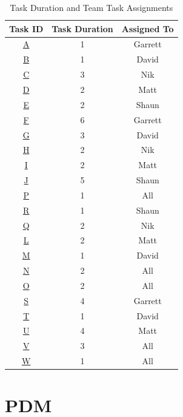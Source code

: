 \begin{table}[H]
\centering
\begin{tabular}{c | c | c}
Task ID & Task Duration & Assigned To \\
\hline
\hyperref[task:A]{A} & 1 & Garrett \\
\hyperref[task:B]{B} & 1 & David \\
\hyperref[task:C]{C} & 3 & Nik \\
\hyperref[task:D]{D} & 2 & Matt \\
\hyperref[task:E]{E} & 2 & Shaun \\
\hyperref[task:F]{F} & 6 & Garrett \\
\hyperref[task:G]{G} & 3 & David \\
\hyperref[task:H]{H} & 2 & Nik \\
\hyperref[task:I]{I} & 2 & Matt \\
\hyperref[task:J]{J} & 5 & Shaun \\
\hyperref[task:P]{P} & 1 & All \\
\hyperref[task:R]{R} & 1 & Shaun \\
\hyperref[task:Q]{Q} & 2 & Nik \\
\hyperref[task:L]{L} & 2 & Matt \\
\hyperref[task:M]{M} & 1 & David \\
\hyperref[task:N]{N} & 2 & All \\
\hyperref[task:O]{O} & 2 & All \\
\hyperref[task:S]{S} & 4 & Garrett \\
\hyperref[task:T]{T} & 1 & David \\
\hyperref[task:U]{U} & 4 & Matt \\
\hyperref[task:V]{V} & 3 & All \\
\hyperref[task:W]{W} & 1 & All \\
\end{tabular}
\caption{Task Duration and Team Task Assignments}
\label{table:tasks}
\end{table}

\section{PDM}

